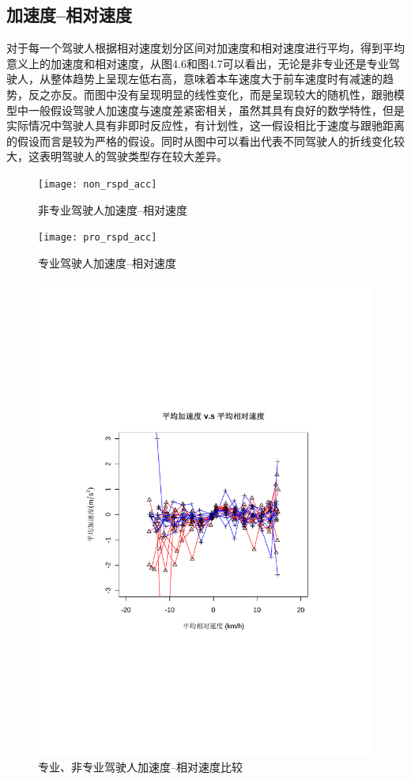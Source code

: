 \subsection{加速度--相对速度}

对于每一个驾驶人根据相对速度划分区间对加速度和相对速度进行平均，得到平均意义上的加速度和相对速度，从图4.6和图4.7可以看出，无论是非专业还是专业驾驶人，从整体趋势上呈现左低右高，意味着本车速度大于前车速度时有减速的趋势，反之亦反。而图中没有呈现明显的线性变化，而是呈现较大的随机性，跟驰模型中一般假设驾驶人加速度与速度差紧密相关，虽然其具有良好的数学特性，但是实际情况中驾驶人具有非即时反应性，有计划性，这一假设相比于速度与跟驰距离的假设而言是较为严格的假设。同时从图中可以看出代表不同驾驶人的折线变化较大，这表明驾驶人的驾驶类型存在较大差异。
\begin{figure}[htpb]
	\centering
	\label{rspd_acc:nonpro}
	\texttt{[image: non\_rspd\_acc]}
	\caption{非专业驾驶人加速度--相对速度}
\end{figure}

\begin{figure}[htpb]
	\centering
	\label{rspd_acc:pro}
	\texttt{[image: pro\_rspd\_acc]}
	\caption{专业驾驶人加速度--相对速度}
\end{figure}

\begin{figure}[htpb]
	\centering
	\label{rspd_acc:all}
	\includegraphics[totalheight=10cm]{all_rspd_acc}
	\caption{专业、非专业驾驶人加速度--相对速度比较}
\end{figure}

